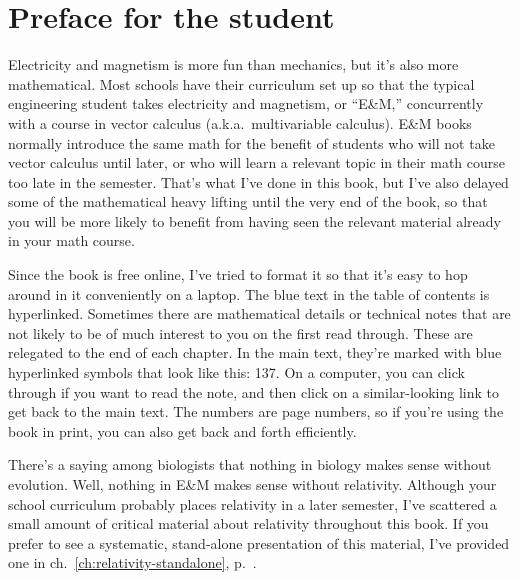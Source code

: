 \section*{Preface for the student}%

Electricity and magnetism is more fun than mechanics, but it's
also more mathematical. Most schools have their curriculum set up
so that the typical engineering student takes electricity and magnetism,
or ``E\&M,'' concurrently with a course in vector calculus (a.k.a.~multivariable
calculus). E\&M books normally introduce the same math for the benefit of
students who will not take vector calculus until later, or who will learn
a relevant topic in their math course too late in the semester. That's
what I've done in this book, but I've also delayed some of the mathematical
heavy lifting until the very end of the book, so that you will be more likely to
benefit from having seen the relevant material already in your math
course.

Since the book is free online, I've tried to format it so that it's
easy to hop around in it conveniently on a laptop. The blue text in the
table of contents is hyperlinked. Sometimes there are mathematical details or technical notes that
are not likely to be of much interest to you on the first read through.
These are relegated to the end of each chapter. In the main text, they're
marked with blue hyperlinked symbols that look like this: 
\dangerousbend{}137. On a computer, you can click through if you want to
read the note, and then click on a similar-looking link to get back to
the main text. The numbers are page numbers, so if you're using the book in print,
you can also get back and forth efficiently.

There's a saying among biologists that nothing in biology makes sense without
evolution. Well, nothing in E\&M makes sense without relativity. Although
your school curriculum probably places relativity in a later semester, I've
scattered a small amount of critical material about relativity throughout
this book. If you prefer to see a systematic, stand-alone presentation of
this material, I've provided one in ch.~\ref{ch:relativity-standalone}, p.~\pageref{ch:relativity-standalone}.
